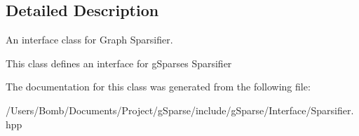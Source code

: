 \subsection{Detailed Description}
An interface class for Graph Sparsifier. 

This class defines an interface for g\+Sparse\textquotesingle{}s Sparsifier 

The documentation for this class was generated from the following file\+:\begin{DoxyCompactItemize}
\item 
/\+Users/\+Bomb/\+Documents/\+Project/g\+Sparse/include/g\+Sparse/\+Interface/Sparsifier.\+hpp\end{DoxyCompactItemize}
